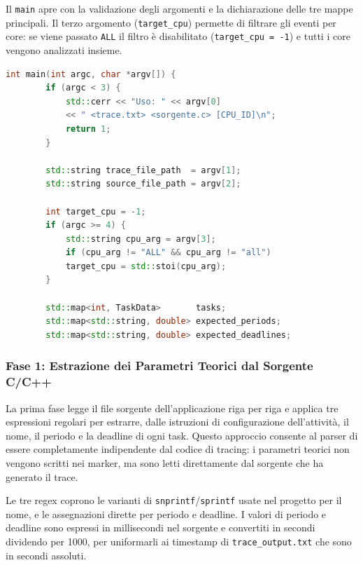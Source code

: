 Il \texttt{main} apre con la validazione degli argomenti e la dichiarazione delle
tre mappe principali. Il terzo argomento (\texttt{target\_cpu}) permette di
filtrare gli eventi per core: se viene passato \texttt{ALL} il filtro è disabilitato
(\texttt{target\_cpu = -1}) e tutti i core vengono analizzati insieme.

\begin{lstlisting}[language=C++, caption={\texttt{thread\_analysis.cpp} -- Ingresso del main e mappe di stato}]
	int main(int argc, char *argv[]) {
		if (argc < 3) {
			std::cerr << "Uso: " << argv[0]
			<< " <trace.txt> <sorgente.c> [CPU_ID]\n";
			return 1;
		}
		
		std::string trace_file_path  = argv[1];
		std::string source_file_path = argv[2];
		
		int target_cpu = -1;
		if (argc >= 4) {
			std::string cpu_arg = argv[3];
			if (cpu_arg != "ALL" && cpu_arg != "all")
			target_cpu = std::stoi(cpu_arg);
		}
		
		std::map<int, TaskData>       tasks;
		std::map<std::string, double> expected_periods;
		std::map<std::string, double> expected_deadlines;
	\end{lstlisting}
	
	\subsubsection{Fase 1: Estrazione dei Parametri Teorici dal Sorgente C/C++}
	
	La prima fase legge il file sorgente dell'applicazione riga per riga e applica
	tre espressioni regolari per estrarre, dalle istruzioni di configurazione
	dell'attività, il nome, il periodo e la deadline di ogni task. Questo approccio
	consente al parser di essere completamente indipendente dal codice di tracing:
	i parametri teorici non vengono scritti nei marker, ma sono letti direttamente
	dal sorgente che ha generato il trace.
	
	Le tre regex coprono le varianti di \texttt{snprintf}/\texttt{sprintf} usate
	nel progetto per il nome, e le assegnazioni dirette per periodo e deadline. I
	valori di periodo e deadline sono espressi in millisecondi nel sorgente e
	convertiti in secondi dividendo per 1000, per uniformarli ai timestamp di
	\texttt{trace\_output.txt} che sono in secondi assoluti.
	

